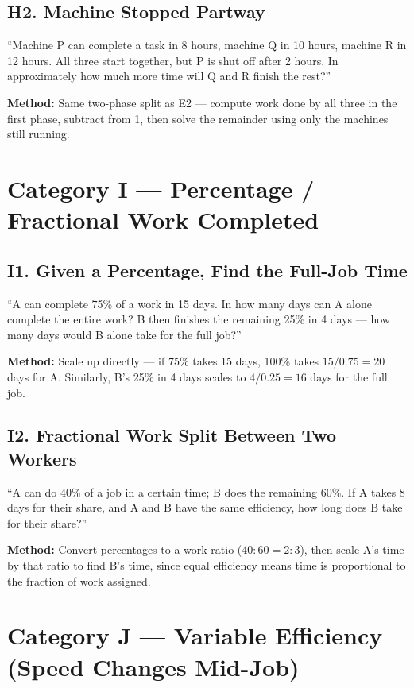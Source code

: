 \documentclass[11pt]{article}
\begin{document}
\subsection*{H2. Machine Stopped Partway}
\begin{tipbox}[Phrasing]
``Machine P can complete a task in 8 hours, machine Q in 10 hours, machine R in 12 hours. All three
start together, but P is shut off after 2 hours. In approximately how much more time will Q and R
finish the rest?''
\end{tipbox}
\textbf{Method:} Same two-phase split as E2 --- compute work done by all three in the first phase,
subtract from 1, then solve the remainder using only the machines still running.

\section*{Category I --- Percentage / Fractional Work Completed}

\subsection*{I1. Given a Percentage, Find the Full-Job Time}
\begin{tipbox}[Phrasing]
``A can complete 75\% of a work in 15 days. In how many days can A alone complete the entire work? B
then finishes the remaining 25\% in 4 days --- how many days would B alone take for the full job?''
\end{tipbox}
\textbf{Method:} Scale up directly --- if 75\% takes 15 days, 100\% takes $15/0.75=20$ days for A.
Similarly, B's 25\% in 4 days scales to $4/0.25=16$ days for the full job.

\subsection*{I2. Fractional Work Split Between Two Workers}
\begin{tipbox}[Phrasing]
``A can do 40\% of a job in a certain time; B does the remaining 60\%. If A takes 8 days for their
share, and A and B have the same efficiency, how long does B take for their share?''
\end{tipbox}
\textbf{Method:} Convert percentages to a work ratio ($40:60=2:3$), then scale A's time by that
ratio to find B's time, since equal efficiency means time is proportional to the fraction of work
assigned.

\section*{Category J --- Variable Efficiency (Speed Changes Mid-Job)}
\end{document}
